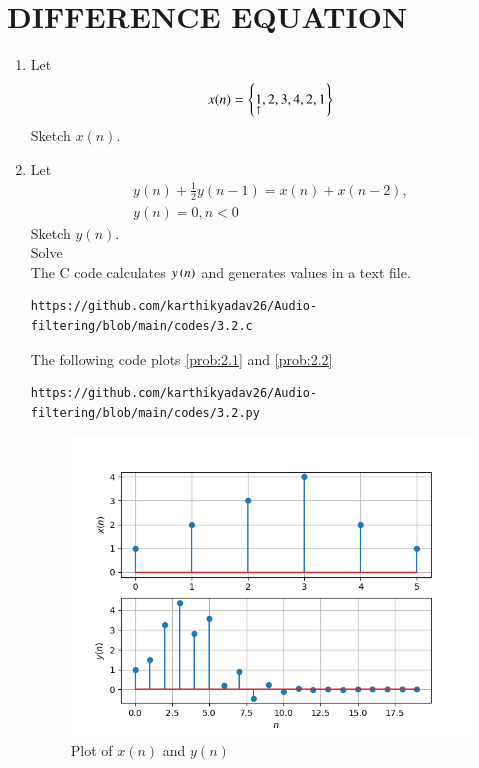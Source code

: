 \documentclass[journal,12pt,twocolumn]{IEEEtran}
\theoremstyle{remark}
\renewcommand\thesection{\arabic{section}}
\begin{document}
\section{DIFFERENCE EQUATION}
\begin{enumerate}[label=\thesection.\arabic*,ref=\thesection.\theenumi]
\item Let
\begin{equation}
x(n) = \left\{\underset{\uparrow}{1},2,3,4,2,1\right\} \label{prob:2.1}
\end{equation}
Sketch $x(n)$. 
\item Let
\begin{multline}
y(n) + \frac{1}{2}y(n-1) = x(n) + x(n-2), 
\\
y(n) = 0, n < 0 \label{prob:2.2}
\end{multline}
Sketch $y(n)$.\\
Solve\\
\solution  The C code calculates $y\left(n\right)$ and generates values in a text file.
\begin{lstlisting}
https://github.com/karthikyadav26/Audio-filtering/blob/main/codes/3.2.c
\end{lstlisting} 
The following code plots \eqref{prob:2.1} and \eqref{prob:2.2}
\begin{lstlisting}
https://github.com/karthikyadav26/Audio-filtering/blob/main/codes/3.2.py
\end{lstlisting}
\newpage
\begin{figure}[htbp]
	\centering
	\includegraphics[width=\columnwidth]{figs/Plot_xn_yn.png}
	\caption{Plot of $x(n)$ and $y(n)$}
	\label{fig:xnyn}
\end{figure}
\end{enumerate}
\end{document}
